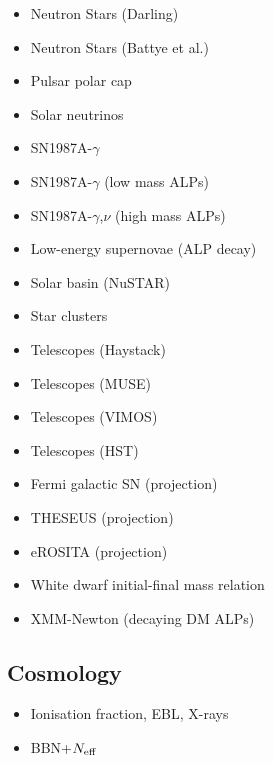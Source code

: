 \documentclass[11pt,twocolumn]{extarticle}
\begin{document}
\begin{mdframed}[everyline=true]
\begin{itemize}
    \item Neutron Stars (Darling)~\cite{Darling:2020uyo}
    \item Neutron Stars (Battye et al.)~\cite{Battye:2021yue}
    \item Pulsar polar cap~\cite{Noordhuis:2022ljw}
    \item Solar neutrinos~\cite{Vinyoles2015}
    \item SN1987A-$\gamma$~\cite{Jaeckel:2017tud}
    \item SN1987A-$\gamma$ (low mass ALPs)~\cite{Payez:2014xsa}
    \item SN1987A-$\gamma$,$\nu$ (high mass ALPs)~\cite{Caputo:2021rux}
    \item Low-energy supernovae (ALP decay)~\cite{Caputo:2022mah}
    \item Solar basin (NuSTAR)~\cite{DeRocco:2022jyq}
    \item Star clusters~\cite{Dessert:2020lil}
    \item Telescopes (Haystack)~\cite{Blout:2000uc}
    \item Telescopes (MUSE)~\cite{Regis:2020fhw}
    \item Telescopes (VIMOS)~\cite{Grin:2006aw}
    \item Telescopes (HST)~\cite{Nakayama:2022jza}
    \item Fermi galactic SN (projection)~\cite{Meyer:2016wrm}
     \item THESEUS (projection)~\cite{Thorpe-Morgan:2020rwc}
    \item eROSITA (projection)~\cite{Dekker:2021bos}
   \item White dwarf initial-final mass relation~\cite{Dolan:2021rya}
   \item XMM-Newton (decaying DM ALPs)~\cite{Foster:2021ngm}
\end{itemize}
\vspace{-2.5em}
\subsection*{Cosmology}\vspace{-0.5em}
\begin{itemize}\setlength\itemsep{-0.5em}
    \item Ionisation fraction, EBL, X-rays~\cite{Cadamuro:2011fd}
    \item BBN+$N_{\rm eff}$~\cite{Depta:2020wmr}
\end{itemize}
\end{mdframed}
\end{document}
